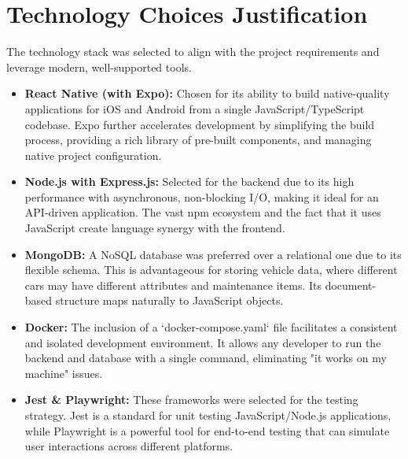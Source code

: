\section{Technology Choices Justification}
The technology stack was selected to align with the project requirements and leverage modern, well-supported tools.
\begin{itemize}
    \item \textbf{React Native (with Expo):} Chosen for its ability to build native-quality applications for iOS and Android from a single JavaScript/TypeScript codebase. Expo further accelerates development by simplifying the build process, providing a rich library of pre-built components, and managing native project configuration.
    \item \textbf{Node.js with Express.js:} Selected for the backend due to its high performance with asynchronous, non-blocking I/O, making it ideal for an API-driven application. The vast npm ecosystem and the fact that it uses JavaScript create language synergy with the frontend.
    \item \textbf{MongoDB:} A NoSQL database was preferred over a relational one due to its flexible schema. This is advantageous for storing vehicle data, where different cars may have different attributes and maintenance items. Its document-based structure maps naturally to JavaScript objects.
    \item \textbf{Docker:} The inclusion of a `docker-compose.yaml` file facilitates a consistent and isolated development environment. It allows any developer to run the backend and database with a single command, eliminating "it works on my machine" issues.
    \item \textbf{Jest \& Playwright:} These frameworks were selected for the testing strategy. Jest is a standard for unit testing JavaScript/Node.js applications, while Playwright is a powerful tool for end-to-end testing that can simulate user interactions across different platforms.
\end{itemize}

